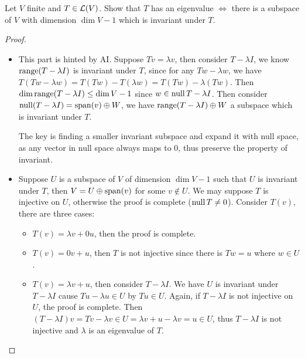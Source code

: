 \documentclass[../main.tex]{subfiles}
\begin{document}
\begin{exercise}
  Let $V$ finite and $T \in \mathcal{L}(V)$. Show that $T$ has an eigenvalue $\iff$
  there is a subspace of $V$ with dimension $\dim V - 1$ which is invariant under $T$.
\end{exercise}
\begin{proof}
  ~
  \begin{itemize}
    \item This part is hinted by AI.
          Suppose $Tv = \lambda v$, then consider $T - \lambda I$,
          we know $\operatorname{range} (T - \lambda I)$ is invariant under $T$,
          since for any $Tw - \lambda w$, we have 
          $T(Tw - \lambda w) = T(Tw) - T(\lambda w) = T(Tw) - \lambda (Tw)$.
          Then $\dim \operatorname{range} (T - \lambda I) \le \dim V - 1$ since $w \in \operatorname{null} T - \lambda I$.
          Then consider $\operatorname{null} (T - \lambda I) = \operatorname{span}(v) \oplus W$,
          we have $\operatorname{range} (T - \lambda I) \oplus W$ a subspace which is invariant under $T$.

          The key is finding a smaller invariant subspace and expand it with null space,
          as any vector in null space always maps to $0$, thus preserve the property of invariant.
    \item Suppose $U$ is a subspace of $V$ of dimension $\dim V - 1$ 
          such that $U$ is invariant under $T$,
          then $V = U \oplus \operatorname{span}(v)$ for some $v \notin U$.
          We may suppose $T$ is injective on $U$, otherwise the proof is complete ($\operatorname{null} T \neq 0$).
          Consider $T(v)$, there are three cases:
          \begin{itemize}
            \item $T(v) = \lambda v + 0u$, then the proof is complete.
            \item $T(v) = 0v + u$, then $T$ is not injective since there is $Tw = u$ where $w \in U$.
            \item $T(v) = \lambda v + u$, then consider $T - \lambda I$. We have $U$ is invariant under $T - \lambda I$
                  cause $Tu - \lambda u \in U$ by $Tu \in U$.
                  Again, if $T - \lambda I$ is not injective on $U$, the proof is complete.
                  Then $(T - \lambda I)v = Tv - \lambda v \in U = \lambda v + u - \lambda v = u \in U$,
                  thus $T - \lambda I$ is not injective and $\lambda$ is an eigenvalue of $T$.
          \end{itemize}
  \end{itemize}
\end{proof}
\end{document}
